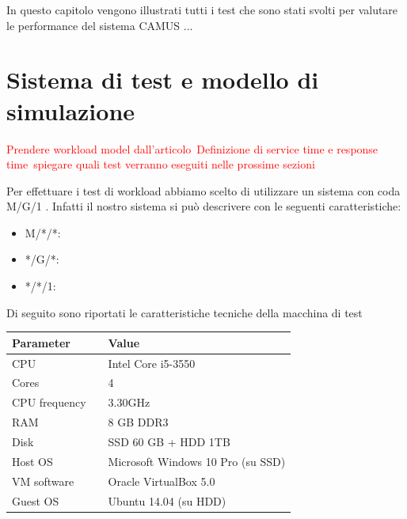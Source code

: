 
In questo capitolo vengono illustrati tutti i test che sono stati svolti per valutare le performance del sistema CAMUS ...

\section{Sistema di test e modello di simulazione}

\textcolor{red}{Prendere workload model dall'articolo\	
	Definizione di service time e response time\
	spiegare quali test verranno eseguiti nelle prossime sezioni}



Per effettuare i test di workload abbiamo scelto di utilizzare un sistema con coda  M/G/1 \cite{sundarapandian2009probability}. Infatti il nostro sistema si può descrivere con le seguenti caratteristiche:

\begin{itemize}
	\item M/*/*: %
	
	\item */G/*: %
	
	\item */*/1: %
\end{itemize}

Di seguito sono riportati le caratteristiche tecniche della macchina di test
\begin{center}
	\begin{tabular}{ l l l }
	Parameter && Value \\ \hline
	CPU && Intel Core i5-3550 \\
	Cores && 4 \\
	CPU frequency && 3.30GHz \\
	RAM && 8 GB DDR3 \\
	Disk && SSD 60 GB + HDD 1TB \\
	Host OS && Microsoft Windows 10 Pro (su SSD)\\
	VM software && Oracle VirtualBox 5.0 \\
	Guest OS && Ubuntu 14.04 (su HDD)
	\end{tabular}
\end{center}

